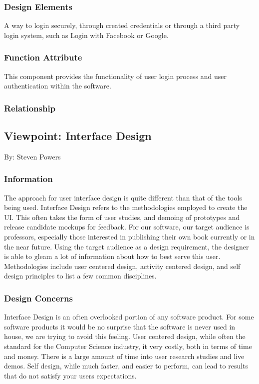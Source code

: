 \documentclass[letterpaper, 10pt, draftclsnofoot, compsoc, onecolumn]{IEEEtran}
\begin{document}
\subsubsection{Design Elements}
{\noindent A way to login securely, through created credentials or through a 
third party login system, such as Login with Facebook or Google.  \par}

\subsubsection{Function Attribute}
{\noindent This component provides the functionality of user login process 
and user authentication within the software.\par}

\subsubsection{Relationship}



\subsection{Viewpoint: Interface Design}
{\noindent By: Steven Powers \par}

\subsubsection{Information}
{\noindent The approach for user interface design is quite different 
than that of the tools being used. Interface Design refers to the 
methodologies employed to create the UI. This often takes the form of 
user studies, and demoing of prototypes and release candidate mockups 
for feedback. For our software, our target audience is professors, 
especially those interested in publishing their own book currently or 
in the near future. Using the target audience as a design requirement, 
the designer is able to gleam a lot of information about how to best 
serve this user. 
Methodologies include user centered design, activity centered design, 
and self design principles to list a few common disciplines.   \par}

\subsubsection{Design Concerns}
{\noindent Interface Design is an often overlooked portion of any software product. 
For some software products it would be no surprise that the software is never 
used in house, we are trying to avoid this feeling. 
User centered design, while often the standard for the Computer Science industry, it
very costly, both in terms of time and money. There is a large amount of time into 
user research studies and live demos. Self design, while much faster, 
and easier to perform, can lead to results that do not satisfy your users expectations.\par}
\end{document}
